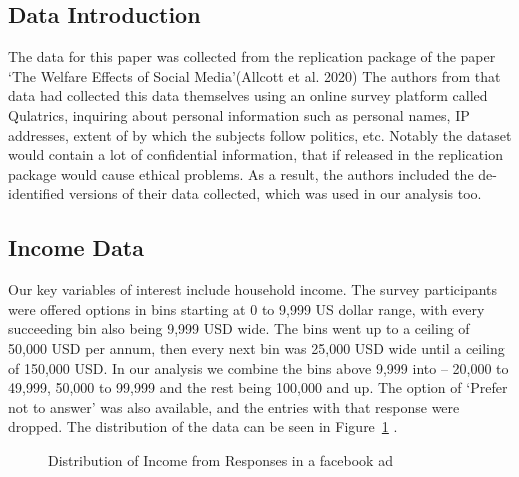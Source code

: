 \documentclass[
  letterpaper,
  DIV=11,
  numbers=noendperiod]{scrartcl}
\begin{document}
\subsection{Data Introduction}\label{sec-dataintro}

The data for this paper was collected from the replication package of
the paper `The Welfare Effects of Social Media'(Allcott et al. 2020) The
authors from that data had collected this data themselves using an
online survey platform called Qulatrics, inquiring about personal
information such as personal names, IP addresses, extent of by which the
subjects follow politics, etc. Notably the dataset would contain a lot
of confidential information, that if released in the replication package
would cause ethical problems. As a result, the authors included the
de-identified versions of their data collected, which was used in our
analysis too.

\subsection{Income Data}\label{sec-income_data}

Our key variables of interest include household income. The survey
participants were offered options in bins starting at 0 to 9,999 US
dollar range, with every succeeding bin also being 9,999 USD wide. The
bins went up to a ceiling of 50,000 USD per annum, then every next bin
was 25,000 USD wide until a ceiling of 150,000 USD. In our analysis we
combine the bins above 9,999 into -- 20,000 to 49,999, 50,000 to 99,999
and the rest being 100,000 and up. The option of `Prefer not to answer'
was also available, and the entries with that response were dropped. The
distribution of the data can be seen in Figure~\ref{fig-figure1} .

\begin{figure}


\caption{\label{fig-figure1}Distribution of Income from Responses in a
facebook ad}

\end{figure}%
\end{document}
